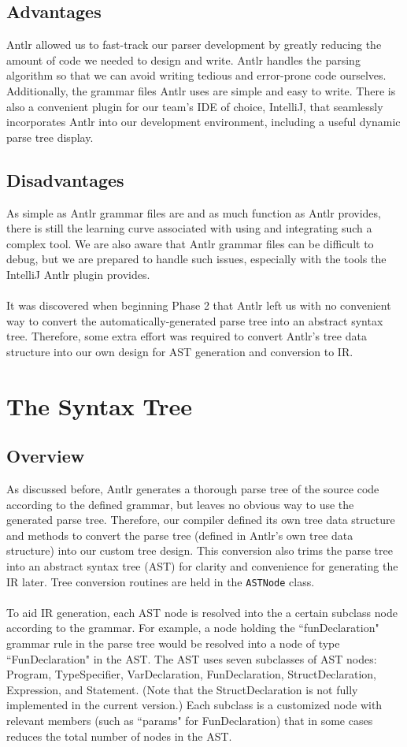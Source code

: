 \documentclass{scrartcl}
\begin{document}
\subsection{Advantages}
Antlr allowed us to fast-track our parser development by greatly reducing the amount of code we needed to design and write. Antlr handles the parsing algorithm so that we can avoid writing tedious and error-prone code ourselves. Additionally, the grammar files Antlr uses are simple and easy to write. There is also a convenient plugin for our team's IDE of choice, IntelliJ, that seamlessly incorporates Antlr into our development environment, including a useful dynamic parse tree display.
\subsection{Disadvantages}
As simple as Antlr grammar files are and as much function as Antlr provides, there is still the learning curve associated with using and integrating such a complex tool. We are also aware that Antlr grammar files can be difficult to debug, but we are prepared to handle such issues, especially with the tools the IntelliJ Antlr plugin provides.\\
\\
It was discovered when beginning Phase 2 that Antlr left us with no convenient way to convert the automatically-generated parse tree into an abstract syntax tree. Therefore, some extra effort was required to convert Antlr's tree data structure into our own design for AST generation and conversion to IR.

\section{The Syntax Tree}
\subsection{Overview}
As discussed before, Antlr generates a thorough parse tree of the source code according to the defined grammar, but leaves no obvious way to use the generated parse tree. Therefore, our compiler defined its own tree data structure and methods to convert the parse tree (defined in Antlr's own tree data structure) into our custom tree design. This conversion also trims the parse tree into an abstract syntax tree (AST) for clarity and convenience for generating the IR later. Tree conversion routines are held in the \verb|ASTNode| class.\\
\\
To aid IR generation, each AST node is resolved into the a certain subclass node according to the grammar. For example, a node holding the ``funDeclaration" grammar rule in the parse tree would be resolved into a node of type ``FunDeclaration" in the AST. The AST uses seven subclasses of AST nodes: Program, TypeSpecifier, VarDeclaration, FunDeclaration, StructDeclaration, Expression, and Statement. (Note that the StructDeclaration is not fully implemented in the current version.) Each subclass is a customized node with relevant members (such as ``params" for FunDeclaration) that in some cases reduces the total number of nodes in the AST.\\
\end{document}
